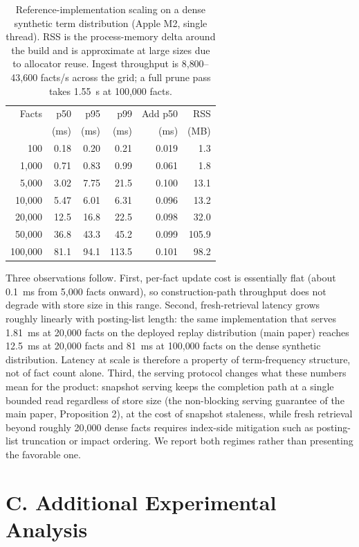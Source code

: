 \documentclass[letterpaper]{article} %
\begin{document}
\begin{table}[t]
\centering
\small
\begin{tabular}{@{}rrrrrr@{}}
\toprule
Facts & p50 & p95 & p99 & Add p50 & RSS \\
 & (ms) & (ms) & (ms) & (ms) & (MB) \\
\midrule
100     & 0.18 & 0.20 & 0.21 & 0.019 & 1.3 \\
1{,}000  & 0.71 & 0.83 & 0.99 & 0.061 & 1.8 \\
5{,}000  & 3.02 & 7.75 & 21.5 & 0.100 & 13.1 \\
10{,}000 & 5.47 & 6.01 & 6.31 & 0.096 & 13.2 \\
20{,}000 & 12.5 & 16.8 & 22.5 & 0.098 & 32.0 \\
50{,}000 & 36.8 & 43.3 & 45.2 & 0.099 & 105.9 \\
100{,}000 & 81.1 & 94.1 & 113.5 & 0.101 & 98.2 \\
\bottomrule
\end{tabular}
\caption{Reference-implementation scaling on a dense synthetic term distribution (Apple M2, single thread). RSS is the process-memory delta around the build and is approximate at large sizes due to allocator reuse. Ingest throughput is 8{,}800--43{,}600 facts/s across the grid; a full prune pass takes 1.55~s at 100{,}000 facts.}
\label{tab:scaling}
\end{table}

Three observations follow. First, per-fact update cost is essentially flat (about 0.1~ms from 5{,}000 facts onward), so construction-path throughput does not degrade with store size in this range. Second, fresh-retrieval latency grows roughly linearly with posting-list length: the same implementation that serves 1.81~ms at 20{,}000 facts on the deployed replay distribution (main paper) reaches 12.5~ms at 20{,}000 facts and 81~ms at 100{,}000 facts on the dense synthetic distribution. Latency at scale is therefore a property of term-frequency structure, not of fact count alone. Third, the serving protocol changes what these numbers mean for the product: snapshot serving keeps the completion path at a single bounded read regardless of store size (the non-blocking serving guarantee of the main paper, Proposition 2), at the cost of snapshot staleness, while fresh retrieval beyond roughly 20{,}000 dense facts requires index-side mitigation such as posting-list truncation or impact ordering. We report both regimes rather than presenting the favorable one.

\section{C. Additional Experimental Analysis}
\end{document}
